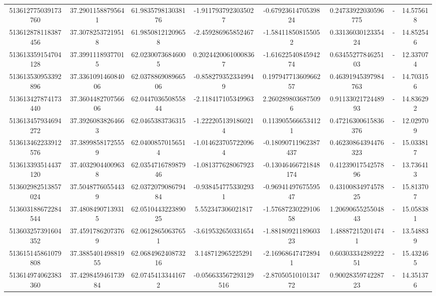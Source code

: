 \documentclass{article}
\begin{document}
\begin{landscape}
\begin{longtable}[c]{S[table-format=18.0]S[table-format=2.15]S[table-format=2.15]S[table-format=-2.17]S[table-format=-2.16]S[table-format=-2.16]S[table-format=-3.16]S[table-format=2.7]}
513612775039173760 & 37.29011588795641  & 61.983579813038176 & -1.9117937923035027   & -0.6792361470539824   & 0.24733922030596775 & {-}                  & 14.575618  \\
513612878118387456 & 37.30782537219518  & 61.98508121209658  & -2.459286965852467    & -1.584118508155052    & 0.3313603012335424  & {-}                  & 14.852546  \\
513613359154704128 & 37.39911189377015  & 62.02300736846005  & 0.20244200610008367   & -1.6162254084594274   & 0.6345527784625103  & {-}                  & 12.337074  \\
513613530953392896 & 37.336109146084006 & 62.037886908966506 & -0.8582793523349949   & 0.19794771360966257   & 0.46391945397984763 & {-}                  & 14.703156  \\
513613427874173440 & 37.360448270756606 & 62.044703650855844 & -2.118417105349963    & 2.2602898036875096    & 0.9113302172448993  & {-}                  & 14.836292  \\
513613457934694272 & 37.39260838264663  & 62.0465383736315   & -1.2222051391860214   & 0.1139055666534121    & 0.47216300615836376 & {-}                  & 12.029709  \\
513613462233912576 & 37.38998581725559  & 62.04008570156514  & -1.0146237057220964   & -0.18090711962387437  & 0.46230864394476323 & {-}                  & 15.033817  \\
513613393514437120 & 37.40329044009638  & 62.035471678987946 & -1.081377628067923    & -0.13046466721848174  & 0.4123901754257896  & {-}                  & 13.736413  \\
513602982513857024 & 37.50487760554439  & 62.037207908679484 & -0.9384547753302931   & -0.9694149767559547   & 0.4310083497457825  & {-}                  & 15.813707  \\
513603188672284544 & 37.48084907139315  & 62.051044322389025 & 5.552347306021817     & -1.5768723022910658   & 1.2069065525504843  & {-}                  & 15.058381  \\
513603257391604352 & 37.45917862073769  & 62.06128650637651  & -3.619532650331654    & -1.8818092118960323   & 1.488872152014741   & {-}                  & 13.548839  \\
513615145861079808 & 37.388540149881955 & 62.068496240873216 & 3.148712965225291     & -2.169686474728941    & 0.6030333428922251  & {-}                  & 15.432465  \\
513614974062383360 & 37.429845946173984 & 62.07454133441672  & -0.056633567293129516 & -2.8705051010134772   & 0.9002835974228723  & {-}                  & 14.351376  \\

\end{longtable}
\end{landscape}
\end{document}
